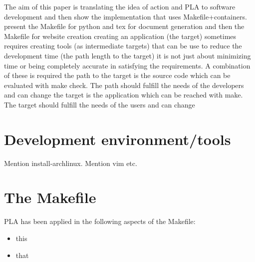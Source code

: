 \documentclass[journal]{IEEEtran}
\begin{document}
The aim of this paper is translating the idea of action and PLA to software development and then show the implementation that uses Makefile+containers.
present the Makefile for python and tex for document generation and then the Makefile for website creation
creating an application (the target) sometimes requires creating tools (as intermediate targets) that can be use to reduce the development time (the path length to the target)
it is not just about minimizing time or being completely accurate in satisfying the requirements. A combination of these is required
the path to the target is the source code which can be evaluated with make check. The path should fulfill the needs of the developers and can change
the target is the application which can be reached with make. The target should fulfill the needs of the users and can change

\section{Development environment/tools}
Mention install-archlinux.
Mention vim etc.

\section{The Makefile}
PLA has been applied in the following aspects of the Makefile:
\begin{itemize}
	\item this
	\item that
\end{itemize}
\end{document}
